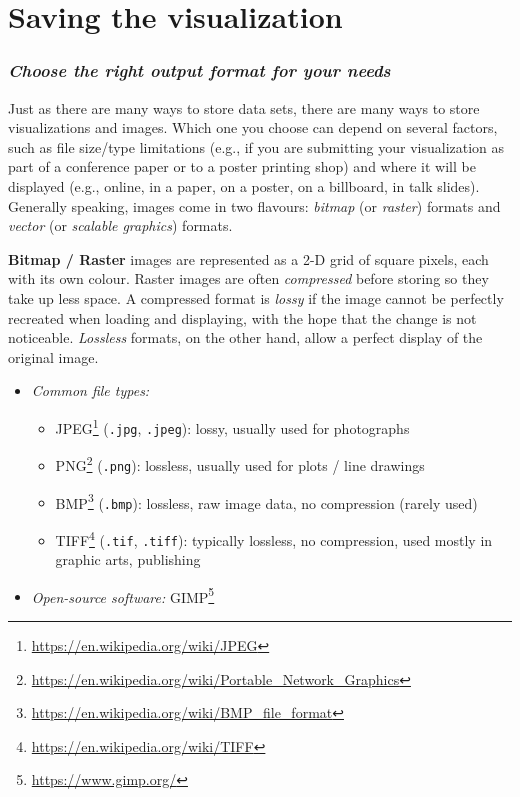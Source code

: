 \documentclass[
]{krantz}
\providecommand{\tightlist}{%
  \setlength{\itemsep}{0pt}\setlength{\parskip}{0pt}}
\renewcommand{\href}[2]{#2\footnote{\url{#1}}}
\begin{document}
\hypertarget{saving-the-visualization}{%
\section{Saving the visualization}\label{saving-the-visualization}}

\hypertarget{choose-the-right-output-format-for-your-needs}{%
\subsubsection{\texorpdfstring{\emph{Choose the right output format for your needs}}{Choose the right output format for your needs}}\label{choose-the-right-output-format-for-your-needs}}

Just as there are many ways to store data sets, there are many ways to store visualizations and images.
Which one you choose can depend on several factors, such as file size/type limitations
(e.g., if you are submitting your visualization as part of a conference paper or to a poster printing shop)
and where it will be displayed (e.g., online, in a paper, on a poster, on a billboard, in talk slides).
Generally speaking, images come in two flavours: \emph{bitmap} (or \emph{raster}) formats and \emph{vector} (or \emph{scalable graphics}) formats.

\textbf{Bitmap / Raster} images are represented as a 2-D grid of square pixels, each with its own colour. Raster images are often \emph{compressed} before storing so they take up less space. A compressed format is \emph{lossy} if the image cannot be perfectly recreated when loading and displaying, with the hope that the change is not noticeable. \emph{Lossless} formats, on the other hand, allow a perfect display of the original image.

\begin{itemize}
\tightlist
\item
  \emph{Common file types:}

  \begin{itemize}
  \tightlist
  \item
    \href{https://en.wikipedia.org/wiki/JPEG}{JPEG} (\texttt{.jpg}, \texttt{.jpeg}): lossy, usually used for photographs
  \item
    \href{https://en.wikipedia.org/wiki/Portable_Network_Graphics}{PNG} (\texttt{.png}): lossless, usually used for plots / line drawings
  \item
    \href{https://en.wikipedia.org/wiki/BMP_file_format}{BMP} (\texttt{.bmp}): lossless, raw image data, no compression (rarely used)
  \item
    \href{https://en.wikipedia.org/wiki/TIFF}{TIFF} (\texttt{.tif}, \texttt{.tiff}): typically lossless, no compression, used mostly in graphic arts, publishing
  \end{itemize}
\item
  \emph{Open-source software:} \href{https://www.gimp.org/}{GIMP}
\end{itemize}
\end{document}
